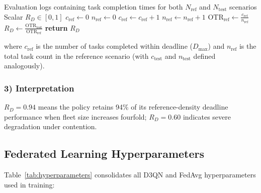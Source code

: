 \documentclass[journal,10pt,twocolumn]{IEEEtran}
\begin{document}
\begin{algorithm}
\caption{Deadline Retention Ratio Computation}
\label{alg:drr}
\begin{algorithmic}[1]
\REQUIRE Evaluation logs containing task completion times for both $N_{\text{ref}}$ and $N_{\text{test}}$ scenarios
\ENSURE Scalar $R_D \in [0, 1]$
\STATE $c_{\text{ref}} \gets 0$
\STATE $n_{\text{ref}} \gets 0$
    \STATE $c_{\text{ref}} \gets c_{\text{ref}} + 1$
  \ENDIF
  \STATE $n_{\text{ref}} \gets n_{\text{ref}} + 1$
\ENDFOR
\STATE $\text{OTR}_{\text{ref}} \gets \frac{c_{\text{ref}}}{n_{\text{ref}}}$
\STATE $R_D \gets \frac{\text{OTR}_{\text{test}}}{\text{OTR}_{\text{ref}}}$
\STATE \textbf{return} $R_D$
\end{algorithmic}
\end{algorithm}

\noindent where $c_{\text{ref}}$ is the number of tasks completed within deadline ($D_{\max}$) and $n_{\text{ref}}$ is the total task count in the reference scenario (with $c_{\text{test}}$ and $n_{\text{test}}$ defined analogously).

\subsubsection*{3) Interpretation}
$R_D = 0.94$ means the policy retains 94\% of its reference-density deadline performance when fleet size increases fourfold; $R_D = 0.60$ indicates severe degradation under contention.

\subsection{Federated Learning Hyperparameters}

Table~\ref{tab:hyperparameters} consolidates all D3QN and FedAvg hyperparameters used in training:
\end{document}
